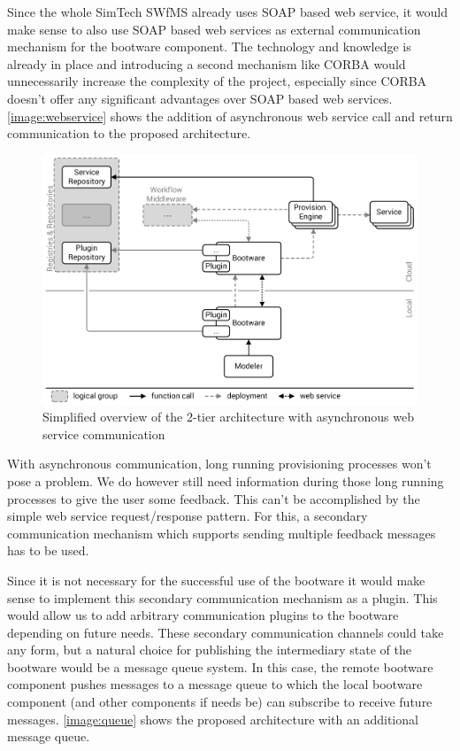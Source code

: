 Since the whole SimTech SWfMS already uses SOAP based web service, it would make sense to also use SOAP based web services as external communication mechanism for the bootware component.
The technology and knowledge is already in place and introducing a second mechanism like CORBA would unnecessarily increase the complexity of the project, especially since CORBA doesn't offer any significant advantages over SOAP based web services.
\autoref{image:webservice} shows the addition of asynchronous web service call and return communication to the proposed architecture.

\begin{figure}[!htbp]
	\centering
	\includegraphics[resolution=600]{design/assets/simple_webservice}
	\caption{Simplified overview of the 2-tier architecture with asynchronous web service communication}
	\label{image:webservice}
\end{figure}

With asynchronous communication, long running provisioning processes won't pose a problem.
We do however still need information during those long running processes to give the user some feedback.
This can't be accomplished by the simple web service request/response pattern.
For this, a secondary communication mechanism which supports sending multiple feedback messages has to be used.

Since it is not necessary for the successful use of the bootware it would make sense to implement this secondary communication mechanism as a plugin.
This would allow us to add arbitrary communication plugins to the bootware depending on future needs.
These secondary communication channels could take any form, but a natural choice for publishing the intermediary state of the bootware would be a message queue system.
In this case, the remote bootware component pushes messages to a message queue to which the local bootware component (and other components if needs be) can subscribe to receive future messages.
\autoref{image:queue} shows the proposed architecture with an additional message queue.


